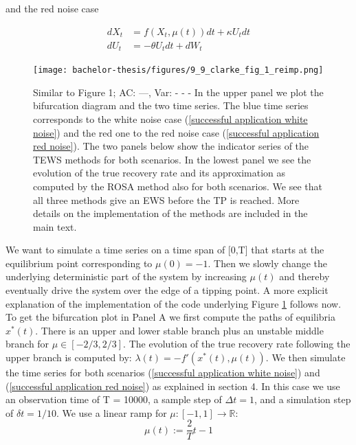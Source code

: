 \documentclass[%
thesis=student,%
coverpage=false,%
titlepage=false,%
headmarks=true, %
english,%
font=libertine, %
math=newpxtx, %
BCOR=5mm,%
coverBCOR=11mm%
]{tumbook}
\begin{document}
and the red noise case

    \begin{equation}
        \begin{aligned}
            dX_{t} & = f(X_{t},\mu(t))dt + \kappa U_{t}dt \\
            dU_{t} & = -\theta U_{t} dt + dW_{t}
        \end{aligned}
        \label{successful application red noise}
    \end{equation}



\begin{figure}
    \centering
    \texttt{[image: bachelor-thesis/figures/9\_9\_clarke\_fig\_1\_reimp.png]}
    \caption{Similar to \cite{Clarke:2023} Figure 1; AC: ---, Var: - - -
    In the upper panel we plot the bifurcation diagram and the two time series. The blue time series corresponds to the white noise case (\ref{successful application white noise}) and the red one to the red noise case (\ref{successful application red noise}). The two panels below show the indicator series of the TEWS methods for both scenarios. In the lowest panel we see the evolution of the true recovery rate and its approximation as computed by the ROSA method also for both scenarios. We see that all three methods give an EWS before the TP is reached. More details on the implementation of the methods are included in the main text.
    }
    \label{success_of_trad_ews_and_rosa}
\end{figure}

We want to simulate a time series on a time span of [0,T] that starts at the equilibrium point corresponding to $\mu(0) = -1$. Then we slowly change the underlying deterministic part of the system by increasing $\mu(t)$ and thereby eventually drive the system over the edge of a tipping point. A more explicit explanation of the implementation of the code underlying Figure \ref{success_of_trad_ews_and_rosa} follows now. To get the bifurcation plot in Panel A we first compute the paths of equilibria $x^{*}(t)$. There is an upper and lower stable branch plus an unstable middle branch for $\mu \in [-2/3,2/3]$. The evolution of the true recovery rate following the upper branch is computed by: $\lambda(t) = -f'(x^{*}(t),\mu(t))$. We then simulate the time series for both scenarios (\ref{successful application white noise}) and (\ref{successful application red noise}) as explained in section 4. In this case we use an observation time of T = 10000, a sample step of $\Delta t = 1$, and a simulation step of $\delta t = 1/10$. We use a linear ramp for $\mu:  [-1,1] \rightarrow \mathbb{R}$:
\[
\mu(t) := \frac{2}{T}t-1
\]
\end{document}
